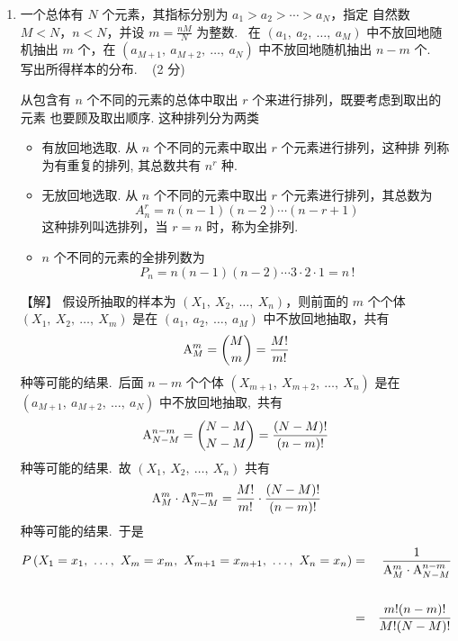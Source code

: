 \documentclass[openany]{book}
\begin{document}
\begin{enumerate}
  \item 一个总体有 $N$ 个元素，其指标分别为 $a_1 > a_2 > \cdots > a_N$，指定
  自然数 $M < N$，$n<N$，并设 $m=\frac{nM}{N}$ 为整数.~
  在 $\left( a_1,~a_2,~\ldots,~a_M \right)$ 中不放回地随机抽出 $m$ 个，在
  $\left( a_{M+1},~a_{M+2},~\ldots,~a_N \right)$
  中不放回地随机抽出 $n-m$ 个.~ 写出所得样本的分布. ~{\color{cyan} (2 分)}

  \begin{remark}
    从包含有 $n$ 个不同的元素的总体中取出 $r$ 个来进行排列，既要考虑到取出的元素
    也要顾及取出顺序. 这种排列分为两类
    \begin{itemize}
      \item 有放回地选取. 从 $n$ 个不同的元素中取出 $r$ 个元素进行排列，这种排
      列称为有重复的排列, 其总数共有 $n^r$ 种.
      \item 无放回地选取.
      从 $n$ 个不同的元素中取出 $r$ 个元素进行排列，其总数为
      \begin{equation}
       A_n^r = n(n-1)(n-2)\cdots(n-r+1)
      \end{equation}
     这种排列叫选排列，当 $r = n$ 时，称为全排列.
     \item $n$ 个不同的元素的全排列数为
     \begin{equation}
      P_n = n(n-1)(n-2)\cdots 3 \cdot 2 \cdot 1 = n\,!
     \end{equation}

    \end{itemize}
  \end{remark}

  {\color{red} \heiti 【解】} {\color{teal} \kaishu
    假设所抽取的样本为 $\left( X_1,~ X_2,~\ldots,~X_n\right)$，则前面的
    $m$ 个个体 $\left( X_1,~ X_2,~\ldots,~X_m\right)$ 是在
    $\left( a_1,~ a_2,~\ldots,~a_M\right)$ 中不放回地抽取，共有
    $$ {\rm A}_M^m = \binom{M}{m}= \displaystyle{\frac{M!}{m!}} $$
    种等可能的结果.~后面 $n-m$ 个个体 $\left( X_{m+1},~
    X_{m+2},~\ldots,~X_n \right)$ 是在
    $\left( a_{M+1},~ a_{M+2},~\ldots,~a_N \right)$ 中不放回地抽取,~共有
    $$ {\rm A}_{N-M}^{n-m} = \binom{N-M}{N-M} =
    \displaystyle{\frac{(N-M)!}{(n-m)!}} $$
    种等可能的结果.~故 $\left( X_1,~ X_2,~\ldots,~X_n \right)$ 共有
    $$ {\rm A}_M^m \cdot {\rm A}_{N-M}^{n-m} = \frac{M!}{m!} \cdot
    \frac{(N-M)!}{(n-m)!} $$
    种等可能的结果.~于是
    \begin{eqnarray*}
      P \left( X_1=x_1,~ \ldots,~ X_m=x_m,~ X_{m+1}=x_{m+1},~
      \ldots,~ X_n=x_n \right) &=&
      \frac{1}{{\rm A}_M^m \cdot {\rm A}_{N-M}^{n-m}} \\ && \\
      &=& \frac{m!(n-m)!}{M!(N-M)!}
    \end{eqnarray*}
  }


\end{enumerate}
\end{document}
